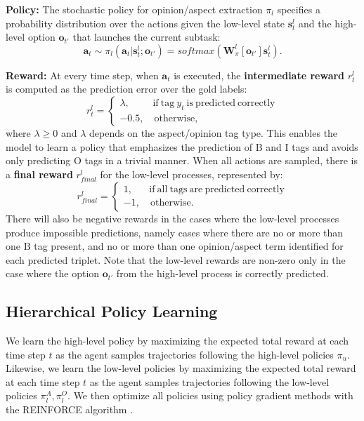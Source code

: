 \documentclass[sigconf]{acmart}
\begin{document}
\textbf{Policy:}
The stochastic policy for opinion/aspect extraction $\pi_l$ specifies a probability distribution over the actions given the low-level state $\mathrm{\textbf{s}}_t^l$ and the high-level option $\mathrm{\textbf{o}}_{t'}$ that launches the current subtask:
\begin{equation}
\mathrm{\textbf{a}}_t \sim \pi_l (\mathrm{\textbf{a}}_t|\mathrm{\textbf{s}}_t^l;\mathrm{\textbf{o}}_{t'}) = softmax(\mathrm{\textbf{W}}_{\pi}^{l}[\mathrm{\textbf{o}}_{t'}]\mathrm{\textbf{s}}_t^l).
\end{equation}

\textbf{Reward:}
At every time step, when $\mathrm{\textbf{a}}_t$ is executed, the \textbf{intermediate reward} $r^l_t$ is computed as the prediction error over the gold labels:
{\small
\begin{equation}
r^l_t = \begin{cases}
\lambda,\quad\ \ \ \ \ \ \mathrm{if\ tag} \ y_t\mathrm{\ is\ predicted\ correctly} \\
-0.5,\quad\mathrm{otherwise},
\end{cases}
\end{equation}
}where $\lambda \geq 0$ and $\lambda$ depends on the aspect/opinion tag type. This enables the model to learn a policy that emphasizes the prediction of B and I tags and avoids only predicting O tags in a trivial manner. When all actions are sampled, there is a \textbf{final reward} $r^l_{final}$ for the low-level processes, represented by:
{\small
\begin{equation}
r^l_{final} = \begin{cases}
1,\quad\ \ \ \mathrm{if\ all\ tags\ are\ predicted\ correctly} \\
-1,\quad\mathrm{otherwise}.
\end{cases}
\end{equation}
}There will also be negative rewards in the cases where the low-level processes produce impossible predictions, namely cases where there are no or more than one $\mathrm{B}$ tag present, and no or more than one opinion/aspect term identified for each predicted triplet. Note that the low-level rewards are non-zero only in the case where the option $\mathrm{\textbf{o}}_{t'}$ from the high-level process is correctly predicted.

\subsection{Hierarchical Policy Learning}
We learn the high-level policy by maximizing the expected total reward at each time step $t$ as the agent samples trajectories following the high-level policies $\pi_u$. Likewise, we learn the low-level policies by maximizing the expected total reward at each time step $t$ as the agent samples trajectories following the low-level policies $\pi_l^A, \pi_l^O$. We then optimize all policies using policy gradient methods \citep{sutton1999policy} with the REINFORCE algorithm \citep{williams1992simple, takanobu2019hierarchical}.
\end{document}
